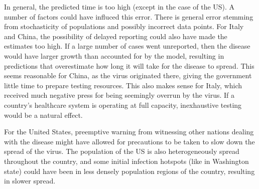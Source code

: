 \documentclass{article}
\begin{document}
In general, the predicted time is too high (except in the case of the US). A number of factors could have influced this error. There is general error stemming from stochasticity of populations and possibly incorrect data points. For Italy and China, the possibility of delayed reporting could also have made the estimates too high. If a large number of cases went unreported, then the disease would have larger growth than accounted for by the model, resulting in predictions that overestimate how long it will take for the disease to spread. This seems reasonable for China, as the virus originated there, giving the government little time to prepare testing resources. This also makes sense for Italy, which received much negative press for being seemingly overrun by the virus. If a country's healthcare system is operating at full capacity, inexhaustive testing would be a natural effect.

For the United States, preemptive warning from witnessing other nations dealing with the disease might have allowed for precautions to be taken to slow down the spread of the virus. The population of the US is also heterogeneously spread throughout the country, and some initial infection hotspots (like in Washington state) could have been in less densely population regions of the country, resulting in slower spread.
\end{document}
